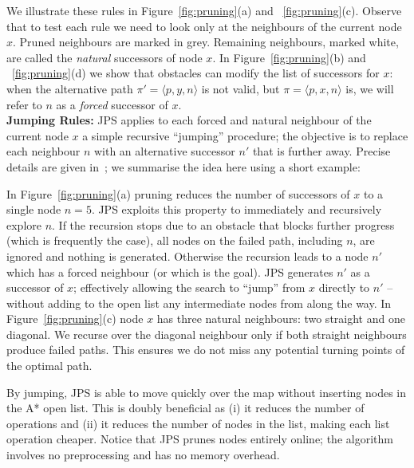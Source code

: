 We illustrate these rules in Figure~\ref{fig:pruning}(a) and ~\ref{fig:pruning}(c).
Observe that to test each rule we need to look only at
the neighbours of the current node $x$. 
Pruned neighbours are marked in grey. Remaining neighbours, marked
white, are called the \emph{natural} successors of node $x$.  
In Figure~\ref{fig:pruning}(b) and ~\ref{fig:pruning}(d) we show
that obstacles can modify the list of successors for $x$:
when the alternative path $\pi' = \langle p, y, n \rangle$ is
not valid, but $\pi = \langle p, x, n \rangle$ is, we will refer to $n$ as
a \emph{forced} successor of $x$.
\\ \newline
\textbf{Jumping Rules:}
JPS applies to each forced and natural neighbour of the current node $x$ a simple recursive
``jumping'' procedure; the objective is to replace each neighbour $n$ with an 
alternative successor $n'$ that is further away. Precise details are given
in~\cite{harabor11b}; we summarise the idea here using a short example:

\begin{example}
In Figure~\ref{fig:pruning}(a) pruning reduces the number
of successors of $x$ to a single node $n = 5$.
JPS exploits this property to immediately and recursively
explore $n$.
If the recursion stops due to an obstacle that blocks further progress
(which is frequently the case), all nodes on the failed path, including $n$, are ignored
and nothing is generated.
Otherwise the recursion leads to a node $n'$ which has a forced
neighbour (or which is the goal). JPS generates $n'$ as a successor of $x$; 
effectively allowing the search to ``jump'' from $x$ directly to $n'$ -- without adding
to the open list any intermediate nodes from along the way.
In Figure~\ref{fig:pruning}(c) node $x$ has three natural neighbours: two straight and one diagonal.
We recurse over the diagonal neighbour only if both straight neighbours produce
failed paths. This ensures we do not miss any potential turning points of the optimal path.
\end{example}

%
By jumping, JPS is able to move quickly over the map 
without inserting nodes in the A* open list.
This is doubly beneficial as (i) it reduces the number of operations 
and (ii) it reduces the number of nodes in the list, 
making each list operation cheaper.  
Notice that JPS prunes nodes entirely online; the algorithm involves no preprocessing and has no memory overhead.  

